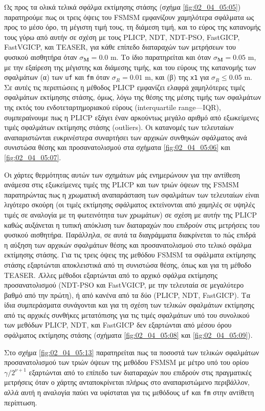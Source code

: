 Ως προς τα ολικά τελικά σφάλμα εκτίμησης στάσης (σχήμα \ref{fig:02_04_05:05})
παρατηρούμε πως οι τρεις όψεις του FSMSM εμφανίζουν χαμηλότερα σφάλματα ως προς
το μέσο όρο, τη μέγιστη τιμή τους, τη διάμεση τιμή, και το εύρος της κατανομής
τους γύρω από αυτήν σε σχέση με τους PLICP, NDT, NDT-PSO, FastGICP, FastVGICP,
και TEASER, για κάθε επίπεδο διαταραχών των μετρήσεων του φυσικού αισθητήρα
όταν $\sigma_{\bm{M}} = 0.0$ m. Το ίδιο παρατηρείται και όταν $\sigma_{\bm{M}}
= 0.05$ m, με την εξαίρεση της μέγιστης και διάμεσης τιμής, και του εύρους της
κατανομής των σφαλμάτων (α) των \texttt{uf} και \texttt{fm} όταν $\sigma_R =
0.01$ m, και (β) της \texttt{x1} για $\sigma_R \leq 0.05$ m. Σε αυτές τις
περιπτώσεις η μέθοδος PLICP εμφανίζει ελαφρά χαμηλότερες τιμές σφαλμάτων
εκτίμησης στάσης, όμως, λόγω της θέσης της μέσης τιμής των σφαλμάτων της εκτός
του ενδοτεταρτημοριακού εύρους (interquartile range---IQR), συμπεραίνουμε πως η
PLICP εξάγει έναν αρκούντως μεγάλο αριθμό από εξωκείμενες τιμές σφαλμάτων
εκτίμησης στάσης (outliers). Οι κατανομές των τελευταίων αναπαριστώνται
ευκρινέστερα συναρτήσει των αρχικών συνθηκών σφάλματος ανά συνιστώσα θέσης και
προσανατολισμού στα σχήματα \ref{fig:02_04_05:06} και \ref{fig:02_04_05:07}.

Οι χάρτες θερμότητας αυτών των σχημάτων μάς ενημερώνουν για την αντίθεση
ανάμεσα στις εξωκείμενες τιμές της PLICP και των τριών όψεων της FSMSM
παρατηρώντας πως η χρωματική αναπαράσταση των σφαλμάτων των τελευταίων είναι
λιγότερο σκούρη (οι τιμές εκτίμησης σφάλματος εκτείνονται από χαμηλές σε υψηλές
τιμές σε αναλογία με τη φωτεινότητα των χρωμάτων) σε σχέση με αυτήν της PLICP
καθώς αυξάνεται η τυπική απόκλιση των διαταραχών που επιδρούν στις μετρήσεις
του φυσικού αισθητήρα. Παράλληλα, σε αυτά τα διαγράμματα διακρίνεται το πώς
επιδρά η αύξηση των αρχικών σφαλμάτων θέσης και προσανατολισμού στο τελικό
σφάλμα εκτίμησης στάσης. Για τις τρεις όψεις της μεθόδου FSMSM τα σφάλματα
εκτίμησης στάσης εξαρτώνται αποκλειστικά από τη συνιστώσα θέσης, όπως και για
τη μέθοδο TEASER. Άλλες μέθοδοι εξαρτώνται από το αρχικό σφάλμα εκτίμησης
προσανατολισμού (NDT-PSO και FastVGICP, με την τελευταία σε μεγαλύτερο βαθμό
από την πρώτη), ή από κανένα από τα δύο (PLICP, NDT, FastGICP). Τα ίδια
συμπεράσματα συνάγονται και για τη σχέση των τελικών σφαλμάτων εκτίμησης από
τις αρχικές συνθήκες μετατόπισης για τις τιμές σφαλμάτων υπό του συνολικού των
μεθόδων PLICP, NDT, και FastGICP δεν εξαρτώνται από  μέσου όρου σφάλματος
εκτίμησης στάσης (σχήματα \ref{fig:02_04_05:08} και \ref{fig:02_04_05:09}).

Στο σχήμα \ref{fig:02_04_05:13} παρατηρείται πως τα ποσοστά των τελικών
σφαλμάτων προσανατολισμού των τριών όψεων της μεθόδου FSMSM με μέτρο υπό του
ορίου $\gamma / 2^{\nu+1}$ εξαρτώνται από το επίπεδο των διαταραχών που
επιδρούν στις πραγματικές μετρήσεις όταν ο χάρτης ανταποκρίνεται πλήρως στο
αναπαριστώμενο περιβάλλον, αλλά αυτή η αναλογία παύει να υφίσταται για τις
μεθόδους \texttt{uf} και \texttt{fm} στην αντίθετη περίπτωση.
